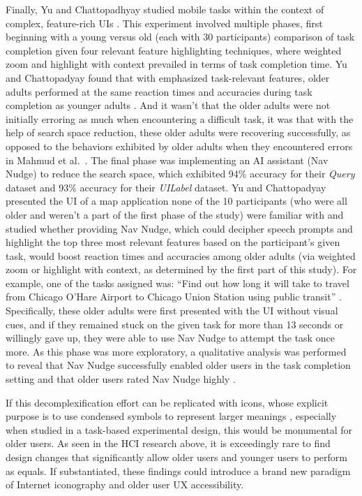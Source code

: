 \documentclass[12pt,twoside]{reedthesis}
\begin{document}
    Finally, Yu and Chattopadhyay studied mobile tasks within the context of complex, feature-rich UIs \cite{yu_reducing_2024}. This experiment involved multiple phases, first beginning with a young versus old (each with 30 participants) comparison of task completion given four relevant feature highlighting techniques, where weighted zoom and highlight with context prevailed in terms of task completion time. Yu and Chattopadyay found that with emphasized task-relevant features, older adults performed at the same reaction times and accuracies during task completion as younger adults \cite{yu_reducing_2024}. And it wasn't that the older adults were not initially erroring as much when encountering a difficult task, it was that with the help of search space reduction, these older adults were recovering successfully, as opposed to the behaviors exhibited by older adults when they encountered errors in Mahmud et al.~\cite{mahmud_learning_2020}. The final phase was implementing an AI assistant (Nav Nudge) to reduce the search space, which exhibited 94\% accuracy for their \textit{Query} dataset and 93\% accuracy for their \textit{UILabel} dataset. Yu and Chattopadyay presented the UI of a map application none of the 10 participants (who were all older and weren't a part of the first phase of the study) were familiar with and studied whether providing Nav Nudge, which could decipher speech prompts and highlight the top three most relevant features based on the participant's given task, would boost reaction times and accuracies among older adults (via weighted zoom or highlight with context, as determined by the first part of this study). For example, one of the tasks assigned was: \enquote{Find out how long it will take to travel from Chicago O’Hare Airport to Chicago Union Station using public transit} \cite{yu_reducing_2024}. Specifically, these older adults were first presented with the UI without visual cues, and if they remained stuck on the given task for more than 13 seconds or willingly gave up, they were able to use Nav Nudge to attempt the task once more. As this phase was more exploratory, a qualitative analysis was performed to reveal that Nav Nudge successfully enabled older users in the task completion setting and that older users rated Nav Nudge highly \cite{yu_reducing_2024}. 
    
    If this decomplexification effort can be replicated with icons, whose explicit purpose is to use condensed symbols to represent larger meanings \cite{ma_semiotics_1995}, especially when studied in a task-based experimental design, this would be monumental for older users. As seen in the HCI research above, it is exceedingly rare to find design changes that significantly allow older users and younger users to perform as equals. If substantiated, these findings could introduce a brand new paradigm of Internet iconography and older user UX accessibility.
\end{document}
